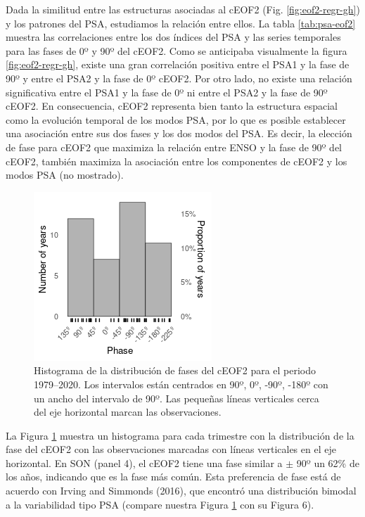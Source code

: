 \documentclass[12pt,oneside]{reedthesis}
\begin{document}
Dada la similitud entre las estructuras asociadas al cEOF2 (Fig. \ref{fig:eof2-regr-gh}) y los patrones del PSA, estudiamos la relación entre ellos.
La tabla \ref{tab:psa-eof2} muestra las correlaciones entre los dos índices del PSA y las series temporales para las fases de 0º y 90º del cEOF2.
Como se anticipaba visualmente la figura \ref{fig:eof2-regr-gh}, existe una gran correlación positiva entre el PSA1 y la fase de 90º y entre el PSA2 y la fase de 0º cEOF2.
Por otro lado, no existe una relación significativa entre el PSA1 y la fase de 0º ni entre el PSA2 y la fase de 90º cEOF2.
En consecuencia, cEOF2 representa bien tanto la estructura espacial como la evolución temporal de los modos PSA, por lo que es posible establecer una asociación entre sus dos fases y los dos modos del PSA.
Es decir, la elección de fase para cEOF2 que maximiza la relación entre ENSO y la fase de 90º del cEOF2, también maximiza la asociación entre los componentes de cEOF2 y los modos PSA (no mostrado).





\begin{figure}
\includegraphics{figures/40-sam-ceof/phase-histogram-1} \caption{Histograma de la distribución de fases del cEOF2 para el periodo 1979--2020.
Los intervalos están centrados en 90º, 0º, -90º, -180º con un ancho del intervalo de 90º.
Las pequeñas líneas verticales cerca del eje horizontal marcan las observaciones.}\label{fig:phase-histogram}
\end{figure}

La Figura \ref{fig:phase-histogram} muestra un histograma para cada trimestre con la distribución de la fase del cEOF2 con las observaciones marcadas con líneas verticales en el eje horizontal.
En SON (panel 4), el cEOF2 tiene una fase similar a \(\pm\) 90º un 62\% de los años, indicando que es la fase más común.
Esta preferencia de fase está de acuerdo con Irving and Simmonds (2016), que encontró una distribución bimodal a la variabilidad tipo PSA (compare nuestra Figura \ref{fig:phase-histogram} con su Figura 6).
\end{document}
